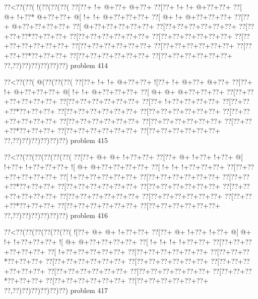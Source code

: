 \vbox{\vbox{\goo
\0??<\0??(\0??(\- !(\0??(\0??(\0??(
\0??[\0??+\- !+\- @+\0??+\- @+\0??+
\0??[\0??+\- !+\- !+\- @+\0??+\0??+
\0??[\- @+\- !+\0??*\- @+\0??+\0??+
\- @[\- !+\- !+\- @+\0??+\0??+\0??+
\0??[\- @+\- !+\- @+\0??+\0??+\0??+
\0??[\0??+\- @+\0??+\0??+\0??+\0??+
\0??[\- @+\0??+\0??+\0??+\0??+\0??+
\0??[\0??+\0??+\0??+\0??+\0??+\0??+
\0??[\0??+\0??+\0??*\0??+\0??+\0??+
\0??[\0??+\0??+\0??+\0??+\0??+\0??+
\0??[\0??+\0??+\0??+\0??+\0??+\0??+
\0??[\0??+\0??+\0??+\0??+\0??+\0??+
\0??[\0??+\0??+\0??+\0??+\0??+\0??+
\0??[\0??+\0??+\0??+\0??+\0??+\0??+
\0??[\0??+\0??+\0??*\0??+\0??+\0??+
\0??[\0??+\0??+\0??+\0??+\0??+\0??+
\0??[\0??+\0??+\0??+\0??+\0??+\0??+
\0??,\0??)\0??)\0??)\0??)\0??)\0??)
}
\hfil problem 414\hfil\break
}

\vbox{\vbox{\goo
\0??<\0??(\0??(\- @(\0??(\0??(\0??(
\0??[\0??+\- !+\- !+\- @+\0??+\0??+
\- ![\0??+\- !+\- @+\0??+\- @+\0??+
\0??[\0??+\- !+\- @+\0??+\0??+\0??+
\- @[\- !+\- !+\- @+\0??+\0??+\0??+
\0??[\- @+\- @+\- @+\0??+\0??+\0??+
\0??[\0??+\0??+\0??+\0??+\0??+\0??+
\0??[\0??+\0??+\0??+\0??+\0??+\0??+
\0??[\0??+\- !+\0??+\0??+\0??+\0??+
\0??[\0??+\0??+\0??*\0??+\0??+\0??+
\0??[\0??+\0??+\0??+\0??+\0??+\0??+
\0??[\0??+\0??+\0??+\0??+\0??+\0??+
\0??[\0??+\0??+\0??+\0??+\0??+\0??+
\0??[\0??+\0??+\0??+\0??+\0??+\0??+
\0??[\0??+\0??+\0??+\0??+\0??+\0??+
\0??[\0??+\0??+\0??*\0??+\0??+\0??+
\0??[\0??+\0??+\0??+\0??+\0??+\0??+
\0??[\0??+\0??+\0??+\0??+\0??+\0??+
\0??,\0??)\0??)\0??)\0??)\0??)\0??)
}
\hfil problem 415\hfil\break
}

\vbox{\vbox{\goo
\0??<\0??(\0??(\0??(\0??(\0??(\0??(
\0??[\0??+\- @+\- @+\- !+\0??+\0??+
\0??[\0??+\- @+\- !+\0??+\- !+\0??+
\- @[\- !+\0??+\- !+\0??+\0??+\0??+
\- ![\- @+\- @+\0??+\0??+\0??+\0??+
\0??[\- !+\- !+\- !+\0??+\0??+\0??+
\0??[\0??+\0??+\0??+\0??+\0??+\0??+
\0??[\- !+\0??+\0??+\0??+\0??+\0??+
\0??[\0??+\0??+\0??+\0??+\0??+\0??+
\0??[\0??+\0??+\0??*\0??+\0??+\0??+
\0??[\0??+\0??+\0??+\0??+\0??+\0??+
\0??[\0??+\0??+\0??+\0??+\0??+\0??+
\0??[\0??+\0??+\0??+\0??+\0??+\0??+
\0??[\0??+\0??+\0??+\0??+\0??+\0??+
\0??[\0??+\0??+\0??+\0??+\0??+\0??+
\0??[\0??+\0??+\0??*\0??+\0??+\0??+
\0??[\0??+\0??+\0??+\0??+\0??+\0??+
\0??[\0??+\0??+\0??+\0??+\0??+\0??+
\0??,\0??)\0??)\0??)\0??)\0??)\0??)
}
\hfil problem 416\hfil\break
}

\vbox{\vbox{\goo
\0??<\0??(\0??(\0??(\0??(\0??(\0??(
\- ![\0??+\- @+\- @+\- !+\0??+\0??+
\0??[\0??+\- @+\- !+\0??+\- !+\0??+
\- @[\- @+\- !+\- !+\0??+\0??+\0??+
\- ![\- @+\- @+\0??+\0??+\0??+\0??+
\0??[\- !+\- !+\- !+\- !+\0??+\0??+
\0??[\0??+\0??+\0??+\0??+\0??+\0??+
\0??[\- !+\0??+\0??+\0??+\0??+\0??+
\0??[\0??+\0??+\0??+\0??+\0??+\0??+
\0??[\0??+\0??+\0??*\0??+\0??+\0??+
\0??[\0??+\0??+\0??+\0??+\0??+\0??+
\0??[\0??+\0??+\0??+\0??+\0??+\0??+
\0??[\0??+\0??+\0??+\0??+\0??+\0??+
\0??[\0??+\0??+\0??+\0??+\0??+\0??+
\0??[\0??+\0??+\0??+\0??+\0??+\0??+
\0??[\0??+\0??+\0??*\0??+\0??+\0??+
\0??[\0??+\0??+\0??+\0??+\0??+\0??+
\0??[\0??+\0??+\0??+\0??+\0??+\0??+
\0??,\0??)\0??)\0??)\0??)\0??)\0??)
}
\hfil problem 417\hfil\break
}

